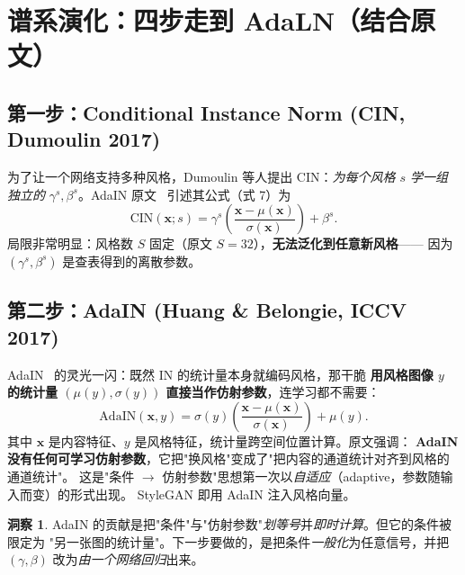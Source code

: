 \documentclass[11pt]{ctexart}
\newcommand{\AdaIN}{\mathrm{AdaIN}}
\newcommand{\CIN}{\mathrm{CIN}}
\newcommand{\xx}{\mathbf{x}}
\theoremstyle{definition}
\newtheorem{insight}{洞察}[section]
\begin{document}
\section{谱系演化：四步走到 AdaLN（结合原文）}

\subsection{第一步：Conditional Instance Norm (CIN, Dumoulin 2017)}
为了让一个网络支持多种风格，Dumoulin 等人提出 CIN：\emph{为每个风格 $s$ 学一组独立的}
$\gamma^s,\beta^s$。AdaIN 原文~\cite{adain} 引述其公式（式 7）为
\begin{equation}
\CIN(\xx;s) = \gamma^{s}\left(\frac{\xx-\mu(\xx)}{\sigma(\xx)}\right) + \beta^{s}.
\end{equation}
局限非常明显：风格数 $S$ 固定（原文 $S=32$），\textbf{无法泛化到任意新风格}——
因为 $(\gamma^s,\beta^s)$ 是查表得到的离散参数。

\subsection{第二步：AdaIN (Huang \& Belongie, ICCV 2017)}
AdaIN~\cite{adain} 的灵光一闪：既然 IN 的统计量本身就编码风格，那干脆
\textbf{用风格图像 $y$ 的统计量 $(\mu(y),\sigma(y))$ 直接当作仿射参数}，连学习都不需要：
\begin{equation}
\label{eq:adain}
\AdaIN(\xx,y) = \sigma(y)\left(\frac{\xx-\mu(\xx)}{\sigma(\xx)}\right) + \mu(y).
\end{equation}
其中 $\xx$ 是内容特征、$y$ 是风格特征，统计量跨空间位置计算。原文强调：
\textbf{AdaIN 没有任何可学习仿射参数}，它把"换风格"变成了"把内容的通道统计对齐到风格的通道统计"。
这是"条件 $\to$ 仿射参数"思想第一次以\emph{自适应}（adaptive，参数随输入而变）的形式出现。
StyleGAN 即用 AdaIN 注入风格向量。

\begin{insight}
AdaIN 的贡献是把"条件"与"仿射参数"\emph{划等号}并\emph{即时计算}。但它的条件被限定为
"另一张图的统计量"。下一步要做的，是把条件\emph{一般化}为任意信号，并把 $(\gamma,\beta)$
改为\emph{由一个网络回归}出来。
\end{insight}
\end{document}
